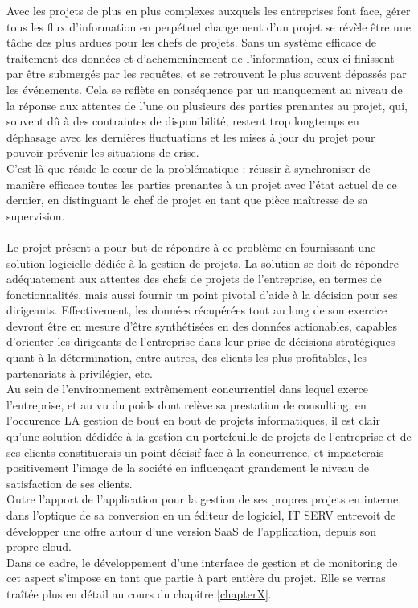 \begin{spacing}{1.5}
Avec les projets de plus en plus complexes auxquels les entreprises font face, gérer tous les flux d'information en perpétuel changement d'un projet se révèle être une tâche des plus ardues pour les chefs de projets. Sans un système efficace de traitement des données et d'achemeninement de l'information, ceux-ci finissent par être submergés par les requêtes, et se retrouvent le plus souvent dépassés par les événements. Cela se reflète en conséquence par un manquement au niveau de la réponse aux attentes de l'une ou plusieurs des parties prenantes au projet, qui, souvent dû à des contraintes de disponibilité, restent trop longtemps en déphasage avec les dernières fluctuations et les mises à jour du projet pour pouvoir prévenir les situations de crise.\\
C'est là que réside le cœur de la problématique : réussir à synchroniser de manière efficace toutes les parties prenantes à un projet avec l'état actuel de ce dernier, en distinguant le chef de projet en tant que pièce maîtresse de sa supervision.\\
\\
Le projet présent a pour but de répondre à ce problème en fournissant une solution logicielle dédiée à la gestion de projets. La solution se doit de répondre adéquatement aux attentes des chefs de projets de l'entreprise, en termes de fonctionnalités, mais aussi fournir un point pivotal d'aide à la décision pour ses dirigeants. Effectivement, les données récupérées tout au long de son exercice devront être en mesure d'être synthétisées en des données actionables, capables d'orienter les dirigeants de l'entreprise dans leur prise de décisions stratégiques quant à la détermination, entre autres,  des clients les plus profitables, les partenariats à privilégier, etc.\\
Au sein de l'environnement extrêmement concurrentiel dans lequel exerce l'entreprise, et au vu du poids dont relève sa prestation de consulting, en l'occurence LA gestion de bout en bout de projets informatiques, il est clair qu'une solution dédidée à la gestion du portefeuille de projets de l'entreprise et de ses clients constituerais un point décisif face à la concurrence, et impacterais positivement l'image de la société en influençant grandement le niveau de satisfaction de ses clients.\\

Outre l'apport de l'application pour la gestion de ses propres projets en interne, dans l'optique de sa conversion en un éditeur de logiciel, IT SERV entrevoit de développer une offre autour d'une version SaaS de l'application, depuis son propre cloud.\\
 Dans ce cadre, le développement d'une interface de gestion et de monitoring de cet aspect s'impose en tant que partie à part entière du projet. Elle se verras traîtée plus en détail au cours du chapitre \ref{chapterX}.



\end{spacing}
